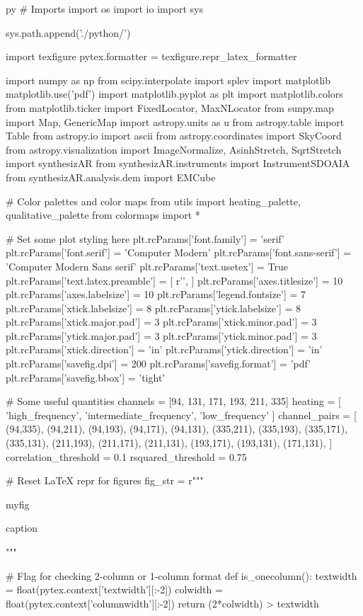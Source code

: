 \begin{pythontexcustomcode}{py}
# Imports
import os
import io
import sys

sys.path.append('./python/')

import texfigure
pytex.formatter = texfigure.repr_latex_formatter

import numpy as np
from scipy.interpolate import splev
import matplotlib
matplotlib.use('pdf')
import matplotlib.pyplot as plt
import matplotlib.colors
from matplotlib.ticker import FixedLocator, MaxNLocator
from sunpy.map import Map, GenericMap
import astropy.units as u
from astropy.table import Table
from astropy.io import ascii
from astropy.coordinates import SkyCoord
from astropy.visualization import ImageNormalize, AsinhStretch, SqrtStretch
import synthesizAR
from synthesizAR.instruments import InstrumentSDOAIA
from synthesizAR.analysis.dem import EMCube

# Color palettes and color maps
from utils import heating_palette, qualitative_palette
from colormaps import *

# Set some plot styling here
plt.rcParams['font.family'] = 'serif'
plt.rcParams['font.serif'] = 'Computer Modern'
plt.rcParams['font.sans-serif'] = 'Computer Modern Sans serif'
plt.rcParams['text.usetex'] = True
plt.rcParams['text.latex.preamble'] = [
    r'\newcommand\arcsec{\mbox{$^{\prime\prime}$}}',
]
plt.rcParams['axes.titlesize'] = 10
plt.rcParams['axes.labelsize'] = 10
plt.rcParams['legend.fontsize'] = 7
plt.rcParams['xtick.labelsize'] = 8
plt.rcParams['ytick.labelsize'] = 8
plt.rcParams['xtick.major.pad'] = 3
plt.rcParams['xtick.minor.pad'] = 3
plt.rcParams['ytick.major.pad'] = 3
plt.rcParams['ytick.minor.pad'] = 3
plt.rcParams['xtick.direction'] = 'in'
plt.rcParams['ytick.direction'] = 'in'
plt.rcParams['savefig.dpi'] = 200
plt.rcParams['savefig.format'] = 'pdf'
plt.rcParams['savefig.bbox'] = 'tight'

# Some useful quantities
channels = [94, 131, 171, 193, 211, 335]
heating = [
    'high_frequency',
    'intermediate_frequency',
    'low_frequency'
]
channel_pairs = [
    (94,335),
    (94,211),
    (94,193),
    (94,171),
    (94,131),
    (335,211),
    (335,193),
    (335,171),
    (335,131),
    (211,193),
    (211,171),
    (211,131),
    (193,171),
    (193,131),
    (171,131),
]
correlation_threshold = 0.1
rsquared_threshold = 0.75

# Reset LaTeX repr for figures
fig_str = r"""
\begin{{{figure_env_name}}}
    \centering
    {myfig}
    \caption{{{caption}}}
    \label{{{label}}}
\end{{{figure_env_name}}}
"""

# Flag for checking 2-column or 1-column format
def is_onecolumn():
    textwidth = float(pytex.context['textwidth'][:-2])
    colwidth = float(pytex.context['columnwidth'][:-2])
    return (2*colwidth) > textwidth
\end{pythontexcustomcode}
